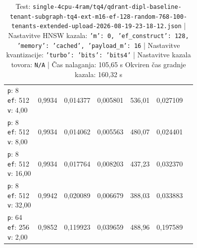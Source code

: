 \begin{table}[htbp]
\begin{tabularx}{\textwidth}{Xrrrrrr}
    \makecell{\texttt{p}: 8\\\texttt{ef}: 512\\\texttt{v}: 4,00} & 0,9934 & 0,014377 & 0,005801 & 536,01 & 0,027109 \\
    \makecell{\texttt{p}: 8\\\texttt{ef}: 512\\\texttt{v}: 8,00} & 0,9934 & 0,014062 & 0,005563 & 480,07 & 0,024401 \\
    \makecell{\texttt{p}: 8\\\texttt{ef}: 512\\\texttt{v}: 16,00} & 0,9934 & 0,017764 & 0,008203 & 437,23 & 0,032370 \\
    \makecell{\texttt{p}: 8\\\texttt{ef}: 512\\\texttt{v}: 32,00} & 0,9942 & 0,020089 & 0,006679 & 388,03 & 0,033883 \\
    \makecell{\texttt{p}: 64\\\texttt{ef}: 256\\\texttt{v}: 2,00} & 0,9852 & 0,119923 & 0,039659 & 488,96 & 0,197589 \\
    \bottomrule
  \end{tabularx}
\caption* {Test: \texttt{single-4cpu-4ram/tq4/qdrant-dipl-baseline-tenant-subgraph-tq4-ext-m16-ef-128-random-768-100-tenants-extended-upload-2026-08-19-23-18-12.json} | Nastavitve HNSW kazala: \texttt{{'m': 0, 'ef\_construct': 128, 'memory': 'cached', 'payload\_m': 16}} | Nastavitve kvantizacije: \texttt{{'turbo': {'bits': 'bits4'}}} | Nastavitve kazala tovora: \texttt{N/A} | Čas nalaganja: 105,65 s Okviren čas gradnje kazala: 160,32 s}\end{table}


